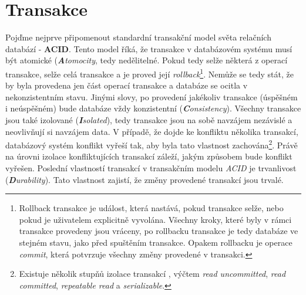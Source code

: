 \section{Transakce}
Pojďme nejprve připomenout standardní transakční model světa relačních databází - \textbf{ACID}. Tento model říká, že transakce v databázovém systému musí být atomické (\textit{\textbf{A}tomocity}, tedy nedělitelné. Pokud tedy selže některá z operací transakce, selže celá transakce a je proved její \textit{rollback}\footnote{Rollback transakce je událost, která nastává, pokud transakce selže, nebo pokud je uživatelem explicitně vyvolána. Všechny kroky, které byly v rámci transakce provedeny jsou vráceny, po rollbacku transakce je tedy databáze ve stejném stavu, jako před spuštěním transakce. Opakem rollbacku je operace \textit{commit}, která potvrzuje všechny změny provedené v transakci.}. Nemůže se tedy stát, že by byla provedena jen část operací transakce a databáze se ocitla v nekonzistentním stavu. Jinými slovy, po provedení jakékoliv transakce (úspěšném i neúspěšném) bude databáze vždy konzistentní (\textit{\textbf{C}onsistency}). Všechny transakce jsou také izolované (\textit{\textbf{I}solated}), tedy transakce jsou na sobě navzájem nezávislé a neovlivňují si navzájem data. V případě, že dojde ke konfliktu několika transakcí, databázový systém konflikt vyřeší tak, aby byla tato vlastnost zachována\footnote{Existuje několik stupňů izolace transakcí , výčtem \textit{read uncommitted}, \textit{read committed}, \textit{repeatable read} a \textit{serializable}.}.
Právě na úrovni izolace konfliktujících transakcí záleží, jakým způsobem bude konflikt vyřešen. Poslední vlastností transakcí v transakčním modelu \textit{ACID} je trvanlivost (\textit{\textbf{D}urability}). Tato vlastnost zajistí, že změny provedené transakcí jsou trvalé.


